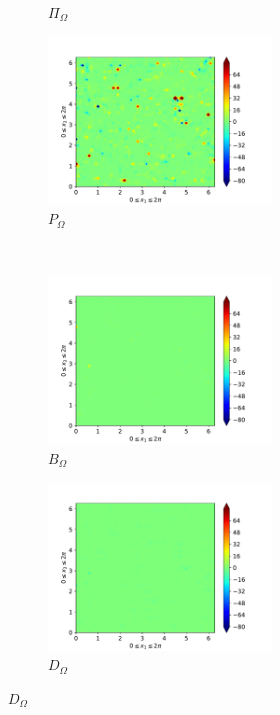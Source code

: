 \begin{figure}[H]
\begin{subfigure}{0.45\textwidth}
        \caption{$\Pi_{\Omega}$}
    \end{subfigure}
    \newline
    \begin{subfigure}{0.45\textwidth}
        \includegraphics[height=1.75in]{media/run-cds-65/P-enst-1380}
        \caption{$P_{\Omega}$}
    \end{subfigure}
    ~
    \begin{subfigure}{0.45\textwidth}
        \includegraphics[height=1.75in]{media/run-cds-65/B-enst-1380}
        \caption{$B_{\Omega}$}
    \end{subfigure}
    \newline
    \begin{subfigure}{0.45\textwidth}
        \includegraphics[height=1.75in]{media/run-cds-65/D-enst-1380}
        \caption{$D_{\Omega}$}
    \end{subfigure}
\end{figure}

\newpage

